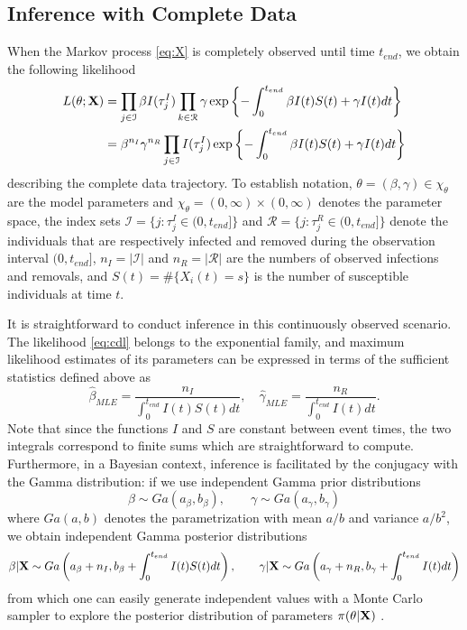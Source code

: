 \documentclass[11pt]{article}
\newcommand{\jx}[1]{{\color{blue}{ #1}}}
\newcommand{\ram}[1]{{\color{green}{ #1}}}
\begin{document}
	\subsection{Inference with Complete Data}
	\label{sec:icd}
	\jx{Need some citations here for form of likelihood, conjugate/MLE forms, etc} 
	When the Markov process \eqref{eq:X} is completely observed until time $t_{end}$, we obtain the following likelihood \ram{ref for likelihood}
	\begin{align}
		L(\theta; \mathbf{X})
		& = \prod_{j \in \mathcal{I}} \beta I(\tau^I_j) \prod_{k \in \mathcal{R}} \gamma \exp\left\lbrace - \int_{0}^{t_{end}}\beta I(t)S(t) + \gamma I(t) dt \right\rbrace  \nonumber \\
		\label{eq:cdl}
		& = \beta^{n_I} \gamma^{n_R}\prod_{j \in \mathcal{I}} I(\tau^I_j) \exp\left\lbrace - \int_{0}^{t_{end}}\beta I(t)S(t) + \gamma I(t) dt \right\rbrace
	\end{align}
	describing the complete data trajectory.
	To establish notation,
	$\theta = (\beta, \gamma) \in \chi_{\theta}$ are the model parameters 
	and $\chi_{\theta} = (0, \infty) \times (0, \infty)$ denotes the parameter space, 
	the index sets $\mathcal{I} = \{j: \tau^I_j \in (0, t_{end}]\}$ and $\mathcal{R} = \{j: \tau^R_j \in (0, t_{end}]\}$ denote the individuals that are respectively infected and removed during the observation interval $(0, t_{end}]$,
	$n_I = |\mathcal{I}|$ and $n_R = |\mathcal{R}|$ are the numbers of observed infections and removals,
	and	$S(t) = \#\{X_i(t) = s\}$ is the number of susceptible individuals at time $t$.
	
	It is straightforward to conduct inference in this continuously observed scenario. The likelihood \eqref{eq:cdl} belongs to the exponential family, and maximum likelihood estimates of its parameters can be expressed in terms of the sufficient statistics defined above as \ram{ref for exponential family and MLE}
	$$\hat{\beta}_{MLE} = \dfrac{n_I}{ \int_{0}^{t_{end}} I(t)S(t)dt}, \quad \hat{\gamma}_{MLE} = \dfrac{n_R}{\int_{0}^{t_{end}} I(t)dt}.$$
	Note that since the functions $I$ and $S$ are constant between event times, the two integrals correspond to finite sums which are straightforward to compute.
	Furthermore, in a Bayesian context, inference is facilitated by the conjugacy with the Gamma distribution: if we use independent Gamma prior distributions
	\begin{equation}
		\label{eq:pri}
		\beta \sim Ga(a_{\beta}, b_{\beta}), \qquad \gamma \sim Ga(a_{\gamma}, b_{\gamma})
	\end{equation}
	where $Ga(a,b)$ denotes the parametrization with mean $a/b$ and variance $a/b^2$, we obtain independent Gamma posterior distributions
	\begin{equation}
		\label{eq:posterior_theta}
		\beta | \mathbf{X} \sim Ga\left( a_{\beta} + n_I, b_{\beta} + \int_{0}^{t_{end}} I(t)S(t) dt\right), \qquad 
		\gamma | \mathbf{X} \sim Ga\left( a_{\gamma} + n_R, b_{\gamma} + \int_{0}^{t_{end}} I(t) dt\right)
	\end{equation}
	from which one can easily generate independent values with a Monte Carlo sampler to explore the posterior distribution of parameters $\pi(\theta|\mathbf{X})$ \cite{Tierney.1994}.
	
\end{document}
